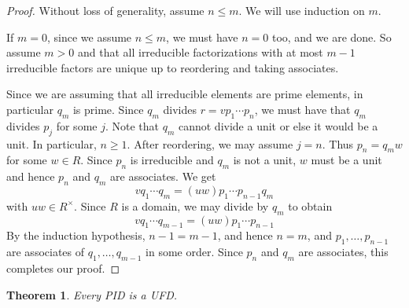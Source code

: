 \documentclass[12pt]{report}
\newtheorem{theorem}{Theorem}[chapter]
\numberwithin{equation}{section}
\numberwithin{theorem}{chapter}
\theoremstyle{definition}
\newtheorem*{basic properties}{Basic Properties}
\newtheorem*{Important Remark}{Important Remark}
\begin{document}
 
\begin{proof}
Without loss of generality, assume $n \leqslant m$. We will use induction on $m$.

If $m = 0$, since we assume $n \leqslant m$, we must have $n = 0$ too, and we are done. So assume $m > 0$ and that all irreducible factorizations with at most $m-1$ irreducible factors are unique up to reordering and taking associates.

Since we are assuming that all irreducible elements are prime elements, in particular $q_m$ is prime. Since $q_m$ divides $r = vp_1 \cdots p_n$, we must have that $q_m$ divides $p_j$ for some $j$. Note that $q_m$ cannot divide a unit or else it would be a unit. In particular, $n \geqslant 1$. After reordering, we may assume $j = n$. Thus $p_n = q_m w$ for some $w \in R$. Since $p_n$ is irreducible and $q_m$ is not a unit, $w$ must be a unit and hence $p_n$ and $q_m$ are associates.  We get
$$vq_1 \cdots q_m = (uw)p_1 \cdots p_{n-1} q_m$$
with $uw \in R^\times$. Since $R$ is a domain, we may divide by $q_m$ to obtain
$$vq_1 \cdots q_{m-1} = (uw)p_1 \cdots p_{n-1}$$
By the induction hypothesis, $n-1=m-1$, and hence $n=m$, and $p_1, \ldots, p_{n-1}$ are associates of $q_1, \ldots,  q_{m-1}$ in some order. Since $p_n$ and $q_m$ are associates, this completes our proof.
\end{proof}



\begin{theorem}\label{PID implies UFD}
Every PID is a UFD.
\end{theorem}
\end{document}
